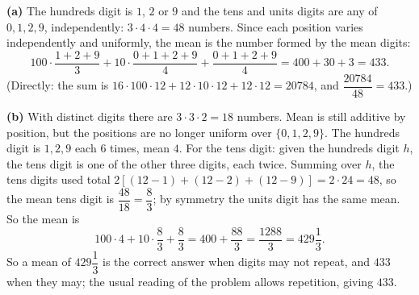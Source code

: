 \textbf{(a)} The hundreds digit is \(1\), \(2\) or \(9\) and the tens and units digits are any of \(0,1,2,9\), independently: \(3\cdot4\cdot4=48\) numbers. Since each position varies independently and uniformly, the mean is the number formed by the mean digits:
\[
100\cdot\dfrac{1+2+9}{3}+10\cdot\dfrac{0+1+2+9}{4}+\dfrac{0+1+2+9}{4}=400+30+3=\boxed{433}.
\]
(Directly: the sum is \(16\cdot100\cdot12+12\cdot10\cdot12+12\cdot12=20784\), and \(\dfrac{20784}{48}=433\).)

\textbf{(b)} With distinct digits there are \(3\cdot3\cdot2=18\) numbers. Mean is still additive by position, but the positions are no longer uniform over \(\{0,1,2,9\}\). The hundreds digit is \(1,2,9\) each \(6\) times, mean \(4\). For the tens digit: given the hundreds digit \(h\), the tens digit is one of the other three digits, each twice. Summing over \(h\), the tens digits used total \(2[(12-1)+(12-2)+(12-9)]=2\cdot24=48\), so the mean tens digit is \(\dfrac{48}{18}=\dfrac{8}{3}\); by symmetry the units digit has the same mean. So the mean is
\[
100\cdot4+10\cdot\dfrac{8}{3}+\dfrac{8}{3}=400+\dfrac{88}{3}=\boxed{\dfrac{1288}{3}=429\dfrac{1}{3}}.
\]
So a mean of \(429\dfrac{1}{3}\) is the correct answer when digits may not repeat, and \(433\) when they may; the usual reading of the problem allows repetition, giving \(433\).
